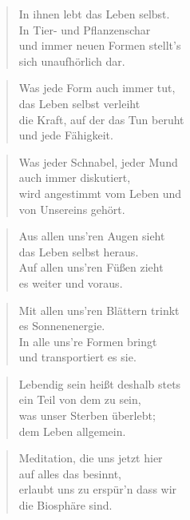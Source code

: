 \documentclass[10pt,a4paper]{article}
\begin{document}
\begin{paracol}{2}
\begin{verse}
In ihnen lebt das Leben selbst. \\
In Tier- und Pflanzenschar \\
und immer neuen Formen stellt’s \\
sich unaufhörlich dar. \\
\end{verse}

\begin{verse}
Was jede Form auch immer tut, \\
das Leben selbst verleiht \\
die Kraft, auf der das Tun beruht \\
und jede Fähigkeit. \\
\end{verse}

\begin{verse}
Was jeder Schnabel, jeder Mund \\
auch immer diskutiert, \\
wird angestimmt vom Leben und \\
von Unsereins gehört. \\
\end{verse}

\begin{verse}
Aus allen uns’ren Augen sieht \\
das Leben selbst heraus. \\
Auf allen uns’ren Füßen zieht \\
es weiter und voraus. \\
\end{verse}

\begin{verse}
Mit allen uns’ren Blättern trinkt \\
es Sonnenenergie. \\
In alle uns’re Formen bringt \\
und transportiert es sie. \\
\end{verse}

\begin{verse}
Lebendig sein heißt deshalb stets \\
ein Teil von dem zu sein, \\
was unser Sterben überlebt; \\
dem Leben allgemein. \\
\end{verse}

\begin{verse}
Meditation, die uns jetzt hier \\
auf alles das besinnt, \\
erlaubt uns zu erspür’n dass wir \\
die Biosphäre sind. \\
\end{verse}


\end{paracol}
\end{document}
